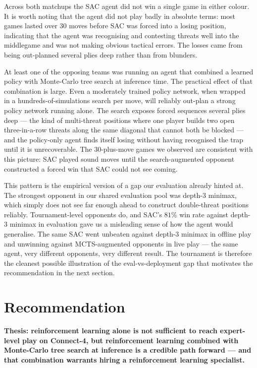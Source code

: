 \documentclass[11pt]{article}
\begin{document}
Across both matchups the SAC agent did not win a single game in
either colour. It is worth noting that the agent did not play badly
in absolute terms: most games lasted over $30$ moves before SAC was
forced into a losing position, indicating that the agent was
recognising and contesting threats well into the middlegame and was
not making obvious tactical errors. The losses came from being
out-planned several plies deep rather than from blunders.

At least one of the opposing teams was running an agent that combined
a learned policy with Monte-Carlo tree search at inference time. The
practical effect of that combination is large. Even a moderately
trained policy network, when wrapped in a hundreds-of-simulations
search per move, will reliably out-plan a strong policy network
running alone. The search exposes forced sequences several plies
deep --- the kind of multi-threat positions where one player builds
two open three-in-a-row threats along the same diagonal that cannot
both be blocked --- and the policy-only agent finds itself losing
without having recognised the trap until it is unrecoverable. The
$30$-plus-move games we observed are consistent with this picture:
SAC played sound moves until the search-augmented opponent
constructed a forced win that SAC could not see coming.

This pattern is the empirical version of a gap our evaluation already
hinted at. The strongest opponent in our shared evaluation pool was
depth-$3$ minimax, which simply does not see far enough ahead to
construct double-threat positions reliably. Tournament-level opponents
do, and SAC's $81\%$ win rate against depth-$3$ minimax in evaluation
gave us a misleading sense of how the agent would generalise. The
same SAC went unbeaten against depth-$3$ minimax in offline play and
unwinning against MCTS-augmented opponents in live play --- the same
agent, very different opponents, very different result. The tournament
is therefore the cleanest possible illustration of the
eval-vs-deployment gap that motivates the recommendation in the next
section.

\section{Recommendation}
\label{sec:reco}

\textbf{Thesis: reinforcement learning alone is not sufficient to
reach expert-level play on Connect-4, but reinforcement learning
combined with Monte-Carlo tree search at inference is a credible path
forward --- and that combination warrants hiring a reinforcement
learning specialist.}
\end{document}
